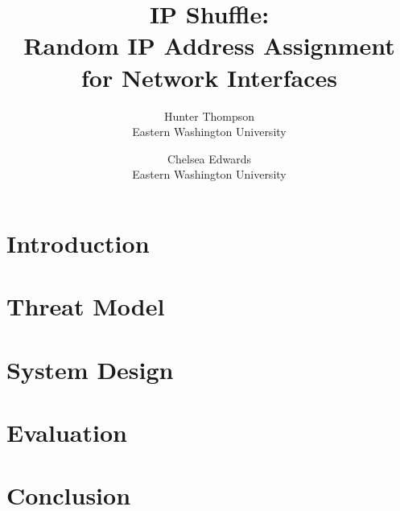 \documentclass[letterpaper,twocolumn,10pt]{article}
\begin{document}

\date{}

\title{\Large \bf IP Shuffle:\\
Random IP Address Assignment for Network Interfaces}

\author{
{\rm Hunter Thompson}\\
Eastern Washington University
\and
{\rm Chelsea Edwards}\\
Eastern Washington University
} %

\maketitle


\begin{abstract}

\end{abstract}


\section{Introduction}



\section{Threat Model}



\section{System Design}



\section{Evaluation}



\section{Conclusion}






\end{document}
